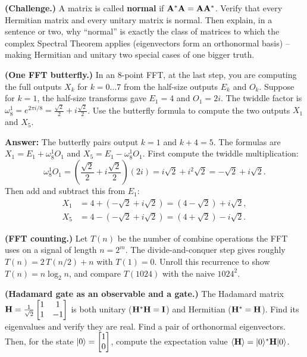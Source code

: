 \begin{exercise}\label{ch32:ex-normalproof}
\textbf{(Challenge.)} A matrix is called \textbf{normal} if $\mathbf{A}^{*}\mathbf{A}=
\mathbf{A}\mathbf{A}^{*}$. Verify that every Hermitian matrix and every unitary matrix is
normal. Then explain, in a sentence or two, why ``normal'' is exactly the class of
matrices to which the complex Spectral Theorem applies (eigenvectors form an
orthonormal basis) -- making Hermitian and unitary two special cases of one bigger
truth.
\end{exercise}


\begin{exercise}\label{ch32:ex-butterfly}
\textbf{(One FFT butterfly.)} In an 8-point FFT, at the last step, you are computing the full outputs $X_k$ for $k=0 \dots 7$ from the half-size outputs $E_k$ and $O_k$. Suppose for $k=1$, the half-size transforms gave $E_1 = 4$ and $O_1 = 2i$. The twiddle factor is $\omega_8^1 = e^{2\pi i/8} = \frac{\sqrt{2}}{2} + i\frac{\sqrt{2}}{2}$. Use the butterfly formula to compute the two outputs $X_1$ and $X_5$.

\textbf{Answer:} 
The butterfly pairs output $k=1$ and $k+4=5$.
The formulas are $X_1 = E_1 + \omega_8^1 O_1$ and $X_5 = E_1 - \omega_8^1 O_1$.
First compute the twiddle multiplication:
\[
  \omega_8^1 O_1 = \left( \frac{\sqrt{2}}{2} + i\frac{\sqrt{2}}{2} \right) (2i) = i\sqrt{2} + i^2\sqrt{2} = -\sqrt{2} + i\sqrt{2}.
\]
Then add and subtract this from $E_1$:
\begin{align*}
  X_1 &= 4 + (-\sqrt{2} + i\sqrt{2}) = (4 - \sqrt{2}) + i\sqrt{2}, \\
  X_5 &= 4 - (-\sqrt{2} + i\sqrt{2}) = (4 + \sqrt{2}) - i\sqrt{2}.
\end{align*}
\end{exercise}
\begin{exercise}\label{ch32:ex-fft-count}
\textbf{(FFT counting.)} Let $T(n)$ be the number of combine operations the FFT
uses on a signal of length $n=2^m$. The divide-and-conquer step gives roughly
$T(n)=2\,T(n/2)+n$ with $T(1)=0$. Unroll this recurrence to show $T(n)=n\log_2 n$,
and compare $T(1024)$ with the naive $1024^2$.
\end{exercise}

\begin{exercise}\label{ch32:ex-hadamard-quantum}
\textbf{(Hadamard gate as an observable and a gate.)} The Hadamard matrix
$\mathbf{H} = \tfrac{1}{\sqrt{2}}\begin{bmatrix}1 & 1 \\ 1 & -1\end{bmatrix}$ is both unitary
($\mathbf{H}^*\mathbf{H} = \mathbf{I}$) and Hermitian ($\mathbf{H}^* = \mathbf{H}$).
Find its eigenvalues and verify they are real. Find a pair of orthonormal
eigenvectors. Then, for the state $\lvert 0 \rangle = \begin{bmatrix}1\\0\end{bmatrix}$, compute the
expectation value $\langle \mathbf{H} \rangle = \lvert 0 \rangle^*\mathbf{H}\lvert 0 \rangle$.
\end{exercise}
